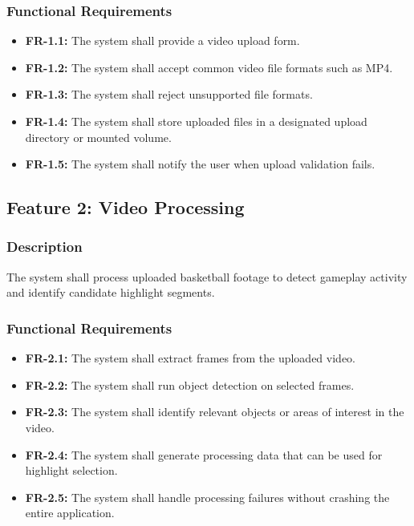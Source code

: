 \documentclass[12pt]{article}
\begin{document}
\subsubsection{Functional Requirements}
\begin{itemize}[noitemsep]
    \item \textbf{FR-1.1:} The system shall provide a video upload form.
    \item \textbf{FR-1.2:} The system shall accept common video file formats such as MP4.
    \item \textbf{FR-1.3:} The system shall reject unsupported file formats.
    \item \textbf{FR-1.4:} The system shall store uploaded files in a designated upload directory or mounted volume.
    \item \textbf{FR-1.5:} The system shall notify the user when upload validation fails.
\end{itemize}

\subsection{Feature 2: Video Processing}

\subsubsection{Description}
The system shall process uploaded basketball footage to detect gameplay activity and identify candidate highlight segments.

\subsubsection{Functional Requirements}
\begin{itemize}[noitemsep]
    \item \textbf{FR-2.1:} The system shall extract frames from the uploaded video.
    \item \textbf{FR-2.2:} The system shall run object detection on selected frames.
    \item \textbf{FR-2.3:} The system shall identify relevant objects or areas of interest in the video.
    \item \textbf{FR-2.4:} The system shall generate processing data that can be used for highlight selection.
    \item \textbf{FR-2.5:} The system shall handle processing failures without crashing the entire application.
\end{itemize}
\end{document}

